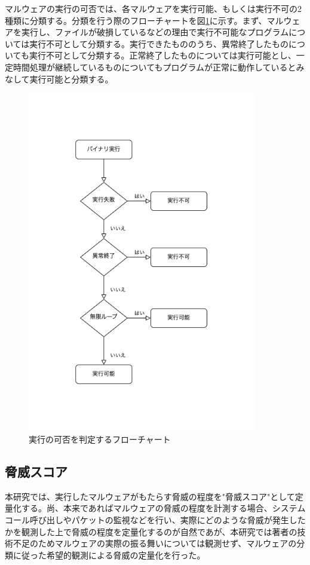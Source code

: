 \documentclass[12pt,a4paper,titlepage,report]{jsbook}
\begin{document}
マルウェアの実行の可否では、各マルウェアを実行可能、もしくは実行不可の2種類に分類する。分類を行う際のフローチャートを図\ref{fig:execflow}に示す。まず、マルウェアを実行し、ファイルが破損しているなどの理由で実行不可能なプログラムについては実行不可として分類する。実行できたもののうち、異常終了したものについても実行不可として分類する。正常終了したものについては実行可能とし、一定時間処理が継続しているものについてもプログラムが正常に動作しているとみなして実行可能と分類する。

\begin{figure}[htbp]
	\begin{center}
		\includegraphics[width=10cm]{img/execflow.png}
		\caption{実行の可否を判定するフローチャート}
		\label{fig:execflow}
	\end{center}
\end{figure}

\subsection{脅威スコア}
本研究では、実行したマルウェアがもたらす脅威の程度を"脅威スコア"として定量化する。尚、本来であればマルウェアの脅威の程度を計測する場合、システムコール呼び出しやパケットの監視などを行い、実際にどのような脅威が発生したかを観測した上で脅威の程度を定量化するのが自然であが、本研究では著者の技術不足のためマルウェアの実際の振る舞いについては観測せず、マルウェアの分類に従った希望的観測による脅威の定量化を行った。
\end{document}
